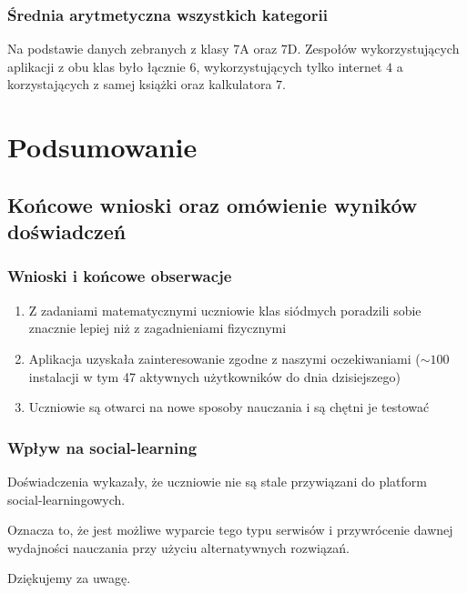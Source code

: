 \documentclass[10pt]{beamer}
\begin{document}
\begin{frame}
\frametitle{Średnia arytmetyczna wszystkich kategorii}

\begin{figure}[H]


\end{figure}

\tiny Na podstawie danych zebranych z klasy 7A oraz 7D. Zespołów wykorzystujących aplikacji z obu klas było łącznie $6$, wykorzystujących tylko internet $4$ a korzystających z samej książki oraz kalkulatora $7$.

\end{frame}

\section{Podsumowanie}
\subsection{Końcowe wnioski oraz omówienie wyników doświadczeń}

\begin{frame}
  \frametitle{Wnioski i końcowe obserwacje}
  \begin{enumerate}
    \item Z zadaniami matematycznymi uczniowie klas siódmych poradzili sobie znacznie lepiej niż z zagadnieniami fizycznymi
    \item Aplikacja uzyskała zainteresowanie zgodne z naszymi oczekiwaniami ($\sim 100$ instalacji w tym 47 aktywnych użytkowników do dnia dzisiejszego)
    \item Uczniowie są otwarci na nowe sposoby nauczania i są chętni je testować
  \end{enumerate}
\end{frame}

\begin{frame}
  \frametitle{Wpływ na social-learning}
  Doświadczenia wykazały, że uczniowie nie są stale przywiązani do platform social-learningowych.

  Oznacza to, że jest możliwe wyparcie tego typu serwisów i przywrócenie dawnej wydajności nauczania przy użyciu alternatywnych rozwiązań.

  \raggedleft Dziękujemy za uwagę.
\end{frame}
\end{document}
